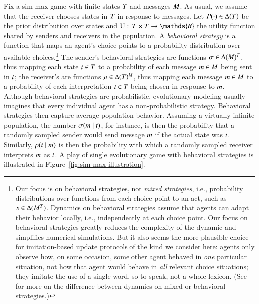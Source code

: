 \documentclass[fleqn,reqno,10pt]{article}
\renewcommand{\Pr}{\ensuremath{P}}
\begin{document}
Fix a sim-max game with finite states $T$ and messages $M$. As usual, we assume
that the receiver chooses states in $T$ in response to messages. Let
$\Pr(\cdot) \in \Delta(\States)$ be the prior distribution over states and
$\Util \mycolon \States \times \States \rightarrow \mathds{R}$ the utility function shared by
senders and receivers in the population. A \emph{behavioral strategy} is a function that maps
an agent's choice points to a probability distribution over available
choices.\footnote{\label{fn:mixedStrats}Our focus is on behavioral strategies, not \emph{mixed
    strategies}, i.e., probability distributions over functions from each choice point to an
  act, such as $s \in \Delta(M^{T})$.  Dynamics on behavioral strategies assume
  that agents can adapt their behavior locally, i.e., independently at each choice point. Our
  focus on behavioral strategies greatly reduces the complexity of the dynamic and simplifies
  numerical simulations. But it also seems the more plausible choice for imitation-based update
  protocols of the kind we consider here: agents only observe how, on some occasion, some other
  agent behaved in \emph{one} particular situation, not how that agent would behave in
  \emph{all} relevant choice situations; they imitate the use of a single word, so to speak,
  not a whole lexicon. (See \citet{Cressman2003:Evolutionary-Dy} for more on the difference
  between dynamics on mixed or behavioral strategies.)} The sender's behavioral strategies are
functions $\sigma \in \Delta(M)^T$, thus mapping each state $t \in T$
to a probability of each message $m \in M$ being sent in $t$; the receiver's
are functions $\rho \in \Delta(T)^M$, thus mapping each message
$m \in M$ to a probability of each interpretation $t \in T$ being chosen
in response to $m$. Although behavioral strategies are probabilistic, evolutionary
modeling usually imagines that every individual agent has a non-probabilistic
strategy. Behavioral strategies then capture average population behavior. Assuming a virtually
infinite population, the number $\sigma(m \mid t)$, for instance, is then the
probability that a randomly sampled sender would send message $m$ if the actual state was
$t$. Similarly, $\rho(t \mid m)$ is then the probability with which a
randomly sampled receiver interprets $m$ as $t$. A play of single evolutionary game
with behavioral strategies is illustrated in Figure~\ref{fig:sim-max-illustration}.
\end{document}
